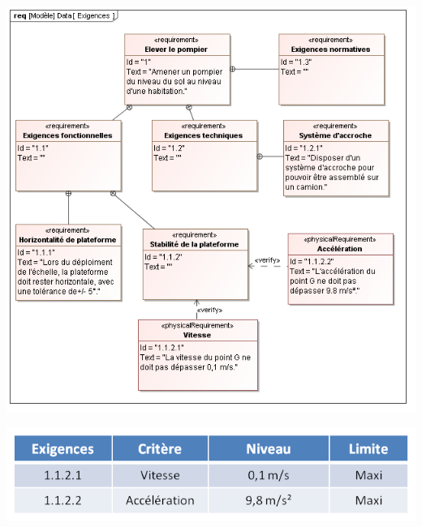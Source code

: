 \documentclass[10pt,oneside]{article}
\begin{document}
{%


\begin{center}
\includegraphics[width=.7\textwidth]{png/Exigences}
\end{center}


\begin{center}
\includegraphics[width=.6\textwidth]{png/cdcf}
\end{center}
}
\end{document}
